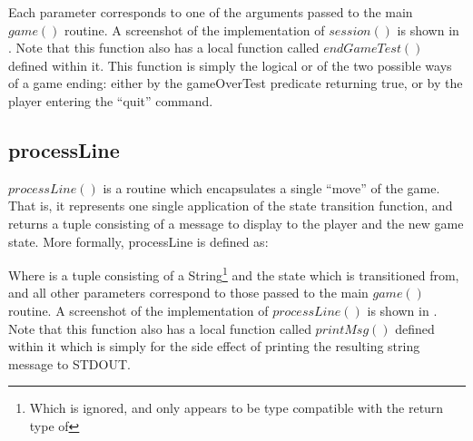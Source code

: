 
Each parameter corresponds to one of the arguments passed to the main \(game()\) routine.  A screenshot of the implementation of \(session()\) is shown in .  Note that this function also has a local function called \(endGameTest()\) defined within it.  This function is simply the logical or of the two possible ways of a game ending: either by the gameOverTest predicate returning true, or by the player entering the ``quit'' command.


\subsection{processLine}

\(processLine()\) is a routine which encapsulates a single ``move'' of the game.  That is, it represents one single application of the state transition function, and returns a tuple consisting of a message to display to the player and the new game state.  More formally, processLine is defined as:


Where  is a tuple consisting of a String\footnote{Which is ignored, and only appears to be type compatible with the return type of } and the state which is transitioned from, and all other parameters correspond to those passed to the main \(game()\) routine.  A screenshot of the implementation of \(processLine()\) is shown in .  Note that this function also has a local function called \(printMsg()\) defined within it which is simply for the side effect of printing the resulting string message to STDOUT.

